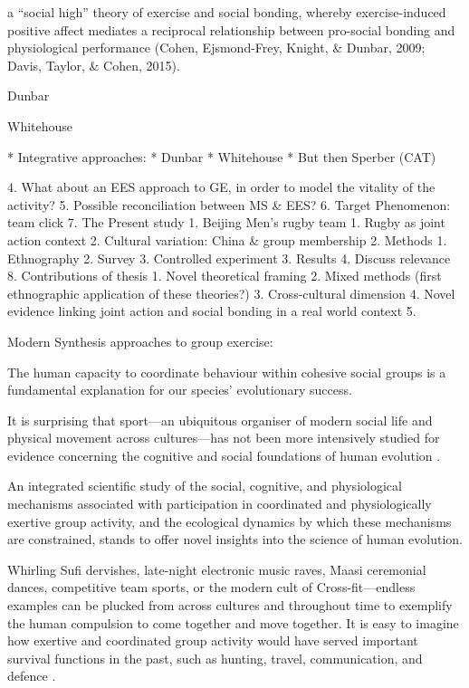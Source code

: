 a ``social high'' theory of exercise and social bonding, whereby exercise-induced positive affect mediates a reciprocal relationship between pro-social bonding and physiological performance (Cohen, Ejsmond-Frey, Knight, & Dunbar, 2009; Davis, Taylor, & Cohen, 2015).

Dunbar

Whitehouse



* Integrative approaches:
    * Dunbar
    * Whitehouse
    * But then Sperber (CAT)



4. What about an EES approach to GE, in order to model the vitality of the activity?
5. Possible reconciliation between MS & EES?
6. Target Phenomenon: team click
7. The Present study
    1. Beijing Men’s rugby team
        1. Rugby as joint action context
        2. Cultural variation: China & group membership
    2. Methods
        1. Ethnography
        2. Survey
        3. Controlled experiment
    3. Results
    4. Discuss relevance
8. Contributions of thesis
    1. Novel theoretical framing
    2. Mixed methods (first ethnographic application of these theories?)
    3. Cross-cultural dimension
    4. Novel evidence linking joint action and social bonding in a real world context
    5.


Modern Synthesis approaches to group exercise:








The human capacity to coordinate behaviour within cohesive social groups is a fundamental explanation for our species' evolutionary success.

It is surprising that sport---an ubiquitous organiser of modern social life and physical movement across cultures---has not been more intensively studied for evidence concerning the cognitive and social foundations of human evolution \citep{Blanchard1995,Downey2005a}.

An integrated scientific study of the social, cognitive, and physiological mechanisms associated with participation in coordinated and physiologically exertive group activity, and the ecological dynamics by which these mechanisms are constrained, stands to offer novel insights into the science of human evolution.



Whirling Sufi dervishes, late-night electronic music raves, Maasi ceremonial dances, competitive team sports, or the modern cult of Cross-fit---endless examples can be plucked from across cultures and throughout time to exemplify the human compulsion to come together and move together.  It is easy to imagine how exertive and coordinated group activity would have served important survival functions in the past, such as hunting, travel, communication, and defence \citep{Sands2010}.

